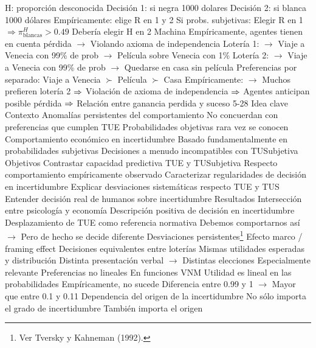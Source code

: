 \documentclass{nuevotema}
\begin{document}
\begin{esquemal}
				\4[] H: proporción desconocida
				\4[] Decisión 1: si negra 1000 dolares
				\4[] Decisión 2: si blanca 1000 dólares
				\4[] Empíricamente: elige R en 1 y 2
				\4[] Si probs. subjetivas:
				\4[] Elegir R en 1 $\Rightarrow \pi^H_{\text{blancas}} > 0.49$
				\4[] Debería elegir H en 2
				\4 Machina
				\4[] Empíricamente, agentes tienen en cuenta pérdida
				\4[] $\to$ Violando axioma de independencia
				\4[] Lotería 1:
				\4[] $\to$ Viaje a Venecia con 99\% de prob
				\4[] $\to$ Película sobre Venecia con 1\%
				\4[] Lotería 2:
				\4[] $\to$ Viaje a Venecia con 99\% de prob
				\4[] $\to$ Quedarse en casa sin película
				\4[] Preferencias por separado:
				\4[] Viaje a Venecia $\succ$ Película $\succ$ Casa
				\4[] Empíricamente:
				\4[] $\to$ Muchos prefieren lotería 2
				\4[] $\Rightarrow$ Violación de axioma de independencia
				\4[] $\Rightarrow$ Agentes anticipan posible pérdida
				\4[] $\Rightarrow$ Relación entre ganancia perdida y suceso
	\1  5-28
		\2 Idea clave
			\3 Contexto
				\4 Anomalías persistentes del comportamiento
				\4[] No concuerdan con preferencias que cumplen TUE
				\4 Probabilidades objetivas rara vez se conocen
				\4 Comportamiento económico en incertidumbre
				\4[] Basado fundamentalmente en probabilidades subjetivas
				\4 Decisiones a menudo incompatibles con TUSubjetiva
			\3 Objetivos
				\4 Contrastar capacidad predictiva TUE y TUSubjetiva
				\4[] Respecto comportamiento empíricamente observado
				\4 Caracterizar regularidades de decisión en incertidumbre
				\4 Explicar desviaciones sistemáticas respecto TUE y TUS
				\4 Entender decisión real de humanos sobre incertidumbre
			\3 Resultados
				\4 Intersección entre psicología y economía
				\4 Descripción positiva de decisión en incertidumbre
				\4 Desplazamiento de TUE como referencia normativa
				\4[] Debemos comportarnos así
				\4[] $\to$ Pero de hecho se decide diferente
		\2 Desviaciones persistentes\footnote{Ver Tversky y Kahneman (1992).}
			\3 Efecto marco / framing effect
				\4 Decisiones equivalentes entre loterías
				\4[] Mismas utilidades esperadas y distribución
				\4[] Distinta presentación verbal
				\4[] $\to$ Distintas elecciones
				\4 Especialmente relevante
			\3 Preferencias no lineales
				\4 En funciones VNM
				\4[] Utilidad es lineal en las probabilidades
				\4 Empíricamente, no sucede
				\4[] Diferencia entre 0.99 y 1
				\4[] $\to$ Mayor que entre 0.1 y 0.11
			\3 Dependencia del origen de la incertidumbre
				\4 No sólo importa el grado de incertidumbre
				\4 También importa el origen

\end{esquemal}
\end{document}
